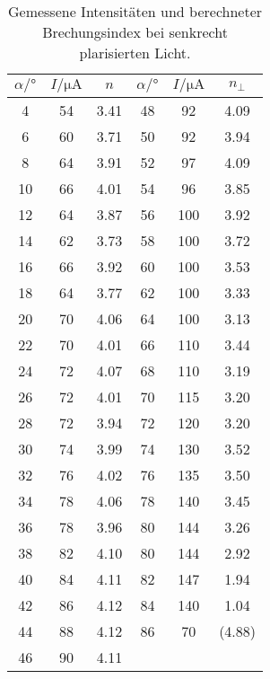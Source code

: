 \begin{table}[H]
  \centering
  \caption{Gemessene Intensitäten und berechneter Brechungsindex bei senkrecht plarisierten Licht.}
  \label{tab:senk}
  \begin{tabular}{c c c c c c}
    \toprule
    $\alpha /°$ & $I / \unit{\micro\ampere}$ & $n$ & $\alpha /°$ & $I / \unit{\micro\ampere}$ & $n_\perp$\\
    \midrule          
    4  &  54  & 3.41    & 48 &  92   & 4.09   \\
    6  &  60  & 3.71    & 50 &  92   & 3.94   \\ 
    8  &  64  & 3.91    & 52 &  97   & 4.09    \\
    10 &  66  & 4.01    & 54 &  96   & 3.85    \\
    12 &  64  & 3.87    & 56 &  100  & 3.92    \\
    14 &  62  & 3.73    & 58 &  100  & 3.72    \\
    16 &  66  & 3.92    & 60 &  100  & 3.53    \\
    18 &  64  & 3.77    & 62 &  100  & 3.33   \\ 
    20 &  70  & 4.06    & 64 &  100  & 3.13    \\
    22 &  70  & 4.01    & 66 &  110  & 3.44    \\
    24 &  72  & 4.07    & 68 &  110  & 3.19    \\
    26 &  72  & 4.01    & 70 &  115  & 3.20    \\
    28 &  72  & 3.94    & 72 &  120  & 3.20    \\
    30 &  74  & 3.99    & 74 &  130  & 3.52    \\
    32 &  76  & 4.02    & 76 &  135  & 3.50   \\ 
    34 &  78  & 4.06    & 78 &  140  & 3.45   \\
    36 &  78  & 3.96    & 80 &  144  & 3.26   \\
    38 &  82  & 4.10    & 80 &  144  & 2.92   \\
    40 &  84  & 4.11    & 82 &  147  & 1.94   \\
    42 &  86  & 4.12    & 84 &  140  & 1.04   \\
    44 &  88  & 4.12    & 86 &  70   & (4.88) \\ 
    46 &  90  & 4.11    &    &       &        \\                 
    \bottomrule
  \end{tabular}
\end{table}
      
